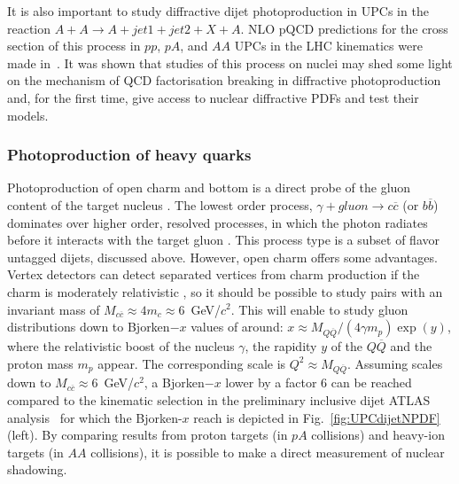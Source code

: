 \documentclass[../report.tex]{subfiles}
\begin{document}
It is also important to study diffractive dijet photoproduction
in UPCs in the reaction $A + A \to A + jet1 +
jet2 + X + A$. NLO pQCD predictions for the cross section of this process in $pp$, $pA$, and $AA$ UPCs in the LHC kinematics were made in~\cite{Guzey:2016tek}. It was shown that studies of this process on nuclei may shed some light on the mechanism of QCD factorisation breaking in diffractive photoproduction and, for the first time, give access to nuclear diffractive PDFs and test their models. 



\subsubsection{Photoproduction of heavy quarks}
\label{sec:upchqdijets}

Photoproduction of open charm and bottom is a direct probe of the gluon content of the target nucleus \cite{Klein:2002wm,Goncalves:2017zdx}.  The lowest order process, $\gamma + gluon\rightarrow c \overline c$ (or $b \overline b$) dominates over higher order, resolved processes, in which the photon radiates before it interacts with the target gluon \cite{Klein:2002wm}.  This process type is a subset of flavor untagged dijets, discussed above.  However, open charm offers some advantages.  Vertex detectors can detect separated vertices from charm production if the charm is moderately relativistic \cite{Bala:2012vg}, so it should be possible to study pairs with an invariant mass of $M_{c\overline c} \approx 4m_c \approx 6$~GeV/$c^2$.  This will enable to study gluon distributions down to Bjorken$-x$ values of around: $x \approx M_{Q\overline Q}/(4\gamma m_p) \exp(y)$, where the relativistic boost of the nucleus $\gamma$, the rapidity $y$ of the $Q\overline Q$ and the proton mass $m_p$ appear. The corresponding scale is $Q^2 \approx M_{Q\overline Q}$.  Assuming  scales down to $M_{c\overline c}\approx 6$~GeV/$c^2$, a Bjorken$-x$ lower by a factor 6 can be reached compared to the kinematic selection in the preliminary inclusive dijet ATLAS analysis~\cite{ATLAS:2017kwa} for which the Bjorken-$x$ reach is depicted in Fig.~\ref{fig:UPCdijetNPDF}(left).  By comparing results from proton targets (in $pA$ collisions) and heavy-ion targets (in $AA$ collisions), it is possible to make a direct  measurement of nuclear shadowing.  
\end{document}
